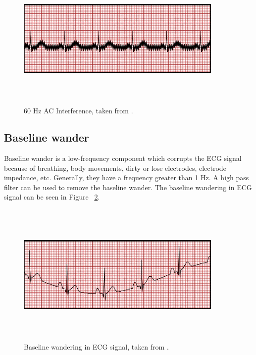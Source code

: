 \begin{figure}[htpb]
	\centering
	\includegraphics[width=10cm,height=7cm,keepaspectratio=true]{images/ACInterference}
	\caption{
		60 Hz AC Interference, taken from \cite{ecg_artifacts}.
	}
	\label{fig:ACInterference}
\end{figure}

\subsection{Baseline wander}
Baseline wander is a low-frequency component which corrupts the ECG signal because of breathing, body movements, dirty or lose electrodes, electrode impedance, etc. Generally, they have a frequency greater than 1 Hz. A high pass filter can be used to remove the baseline wander. The baseline wandering in ECG signal can be seen in Figure ~\ref{fig:WBaseline}.

\begin{figure}[htpb]
	\centering
	\includegraphics[width=10cm,height=7cm,keepaspectratio=true]{images/WBaseline}
	\caption{
		Baseline wandering in ECG signal, taken from \cite{ecg_artifacts}.
	}
	\label{fig:WBaseline}
\end{figure}

